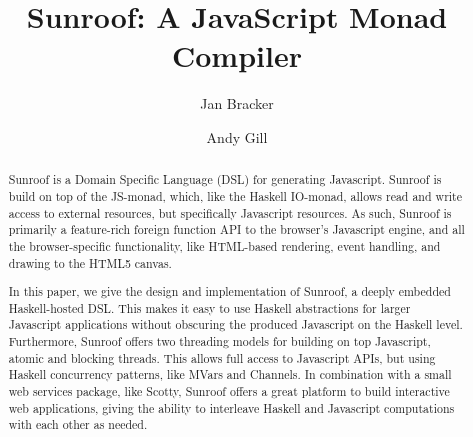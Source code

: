\documentclass{llncs}
\begin{document}
%
\title{Sunroof: A JavaScript Monad Compiler}
%
%
\author{Jan Bracker  \and Andy Gill}
%
%
%


\maketitle

\begin{abstract}        
        
Sunroof is a Domain Specific Language (DSL) for generating Javascript.
Sunroof is build on top of the JS-monad, which, like the Haskell IO-monad, allows 
read and write access to external resources, but specifically Javascript
resources. As such, Sunroof is primarily a feature-rich foreign
function API to the browser's Javascript engine, and all the browser-specific
functionality, like HTML-based rendering, event handling, and 
drawing to the HTML5 canvas. 

In this paper, we give the design and implementation of Sunroof, a 
deeply embedded Haskell-hosted DSL.
This makes it easy to use Haskell abstractions for larger Javascript
applications without obscuring the produced Javascript on the Haskell
level. 
Furthermore, Sunroof offers two threading models for 
building on top Javascript, atomic and blocking threads.
This allows full access to Javascript APIs, but
using Haskell concurrency patterns, like MVars and Channels.
In combination with a small web services package, like Scotty,
Sunroof offers a great platform to build interactive web applications,
giving the ability to interleave Haskell and Javascript computations
with each other as needed.
\end{abstract}
%
\end{document}
